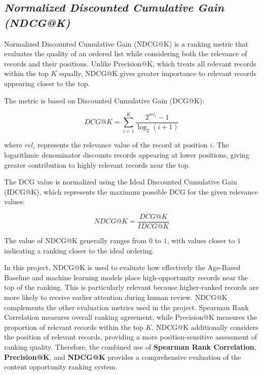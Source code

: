 \documentclass[12pt,a4paper]{report}
\begin{document}
\subsection{\textit{Normalized Discounted Cumulative Gain (NDCG@K)}}

Normalized Discounted Cumulative Gain (NDCG@K) is a ranking metric that evaluates the quality of an ordered list while considering both the relevance of records and their positions. Unlike Precision@K, which treats all relevant records within the top $K$ equally, NDCG@K gives greater importance to relevant records appearing closer to the top.

The metric is based on Discounted Cumulative Gain (DCG@K):

\begin{equation}
DCG@K =
\sum_{i=1}^{K}
\frac{2^{rel_i}-1}
{\log_2(i+1)}
\end{equation}

where $rel_i$ represents the relevance value of the record at position $i$. The logarithmic denominator discounts records appearing at lower positions, giving greater contribution to highly relevant records near the top.

The DCG value is normalized using the Ideal Discounted Cumulative Gain (IDCG@K), which represents the maximum possible DCG for the given relevance values:

\begin{equation}
NDCG@K =
\frac{DCG@K}{IDCG@K}
\end{equation}

The value of NDCG@K generally ranges from $0$ to $1$, with values closer to $1$ indicating a ranking closer to the ideal ordering.

In this project, NDCG@K is used to evaluate how effectively the Age-Based Baseline and machine learning models place high-opportunity records near the top of the ranking. This is particularly relevant because higher-ranked records are more likely to receive earlier attention during human review. NDCG@K complements the other evaluation metrics used in the project. Spearman Rank Correlation measures overall ranking agreement, while Precision@K measures the proportion of relevant records within the top $K$. NDCG@K additionally considers the position of relevant records, providing a more position-sensitive assessment of ranking quality. Therefore, the combined use of \textbf{Spearman Rank Correlation}, \textbf{Precision@K}, and \textbf{NDCG@K} provides a comprehensive evaluation of the content opportunity ranking system.
\end{document}
